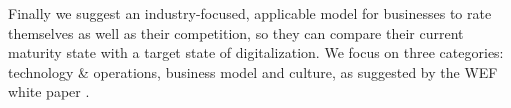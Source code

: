 Finally we suggest an industry-focused, applicable model for businesses to rate themselves as well as their competition, so they can compare their current maturity state with a target state of digitalization. We focus on three categories: technology \& operations, business model and culture, as suggested by the \ac{WEF} white paper \cite{worldforumdigitalenterprise:2016}.


